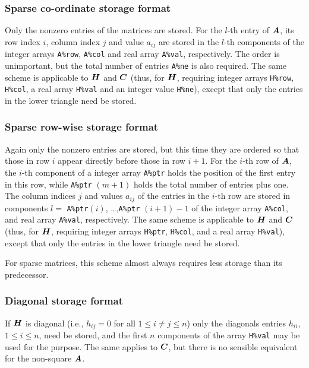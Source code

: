 \documentclass{galahad}
\begin{document}
\subsubsection{Sparse co-ordinate storage format}\label{coordinate}
Only the nonzero entries of the matrices are stored. For the 
$l$-th entry of ${\bm{A}}$, its row index $i$, column index $j$ 
and value $a_{ij}$
are stored in the $l$-th components of the integer arrays {\tt A\%row}, 
{\tt A\%col} and real array {\tt A\%val}, respectively.
The order is unimportant, but the total
number of entries {\tt A\%ne} is also required. 
The same scheme is applicable to ${\bm{H}}$ and ${\bm{C}}$ 
(thus, for ${\bm{H}}$, requiring integer arrays {\tt H\%row}, {\tt H\%col}, a real 
array  {\tt H\%val} and an integer value {\tt H\%ne}),
except that only the entries in the lower triangle need be stored.

\subsubsection{Sparse row-wise storage format}\label{rowwise}
Again only the nonzero entries are stored, but this time
they are ordered so that those in row $i$ appear directly before those
in row $i+1$. For the $i$-th row of ${\bm{A}}$, the $i$-th component of a 
integer array {\tt A\%ptr} holds the position of the first entry in this row,
while {\tt A\%ptr} $(m+1)$ holds the total number of entries plus one.
The column indices $j$ and values $a_{ij}$ of the entries in the $i$-th row 
are stored in components 
$l =$ {\tt A\%ptr}$(i)$, \ldots ,{\tt A\%ptr} $(i+1)-1$ of the 
integer array {\tt A\%col}, and real array {\tt A\%val}, respectively. 
The same scheme is applicable to
${\bm{H}}$ and ${\bm{C}}$ (thus, for ${\bm{H}}$, 
requiring integer arrays {\tt H\%ptr}, {\tt H\%col}, and 
a real array {\tt H\%val}),
except that only the entries in the lower triangle need be stored.

For sparse matrices, this scheme almost always requires less storage than 
its predecessor.

\subsubsection{Diagonal storage format}\label{diagonal}
If ${\bm{H}}$ is diagonal (i.e., $h_{ij} = 0$ for all $1 \leq i \neq j \leq n$)
only the diagonals entries $h_{ii}$, $1 \leq i \leq n$,  need be stored,
and the first $n$ components of the array {\tt H\%val} may be used for 
the purpose. The same applies to ${\bm{C}}$, but
there is no sensible equivalent for the non-square ${\bm{A}}$.
\end{document}
